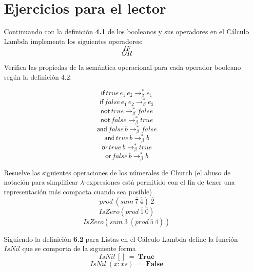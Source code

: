             \section{Ejercicios para el lector}

                \begin{exercise}
                    Continuando con la definición \textbf{4.1} de los booleanos y sus operadores en el Cálculo Lambda implementa los siguientes operadores:
                    \[IF\]
                    \[OR\]
                \end{exercise}

                \begin{exercise}
                    Verifica las propiedas de la semántica operacional para cada operador booleano según la definición 4.2:

                        $$\mathsf{if}\,true\,e_1\,e_2 \to_\beta^* e_1$$ 
                        $$\mathsf{if}\,false\,e_1\,e_2 \to_\beta^* e_2$$ 
                        $$\mathsf{not}\,true\to_\beta^* false$$
                        $$\mathsf{not}\,false\to_\beta^* true$$
                        $$\mathsf{and}\,false\,b\to_\beta^* false$$
                        $$\mathsf{and}\,true\,b\to_\beta^* b$$
                        $$\mathsf{or}\,true\,b\to_\beta^* true$$
                        $$\mathsf{or}\,false\,b\to_\beta^* b$$
                        
                \end{exercise}


                \begin{exercise}
                    Resuelve las siguientes operaciones de los númerales de Church (el abuso de notación para simplificar $\lambda$-expresiones está permitido con el fin de tener una representación más compacta cuando sea posible)
                    \[
                            prod\ (sum\ \overline{7}\ \overline{4})\ \overline{2}
                    \]
                    \[
                            IsZero (prod\ \overline{1}\ \overline{0})
                    \]
                    \[
                            IsZero( sum\ \overline{3}\ (prod\ \overline{5}\ \overline{4}))
                    \]
                \end{exercise}  

                \begin{exercise}
                    Siguiendo la definición \textbf{6.2} para Listas en el Cálculo Lambda define la función $IsNil$ que se comporta de la siguiente forma
                    \[ IsNil\ []\ =\ \textbf{True} \]
                    \[ IsNil\ (x:xs)\  =\ \textbf{False}\]
                \end{exercise}

